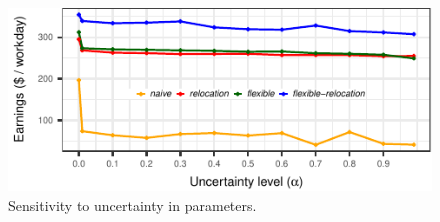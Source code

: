 \begin{figure}[hb]
	\centering
	\includegraphics{figures/uncertainty_evolution.pdf}
	\caption{Sensitivity to uncertainty in parameters.}
	\label{fig:uncertainty_evolution}
\end{figure}





